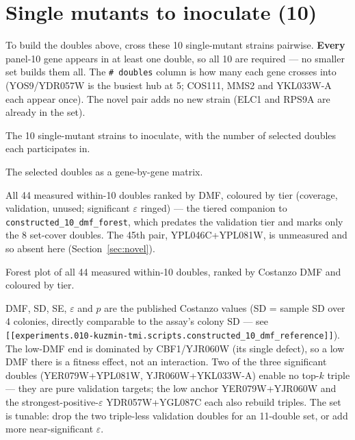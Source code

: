 \section{Single mutants to inoculate (10)}

To build the doubles above, cross these 10 single-mutant strains pairwise. \textbf{Every}
panel-10 gene appears in at least one double, so all 10 are required --- no smaller set builds
them all. The \texttt{\# doubles} column is how many each gene crosses into (YOS9/YDR057W is
the busiest hub at 5; COS111, MMS2 and YKL033W-A each appear once). The novel pair adds no new
strain (ELC1 and RPS9A are already in the set).

%
  {The 10 single-mutant strains to inoculate, with the number of selected doubles each
   participates in.}

%
  {The selected doubles as a gene-by-gene matrix.}

All 44 measured within-10 doubles ranked by DMF, coloured by tier (coverage, validation,
unused; significant $\varepsilon$ ringed) --- the tiered companion to
\texttt{constructed\_10\_dmf\_forest}, which predates the validation tier and marks only the 8
set-cover doubles. The 45th pair, YPL046C+YPL081W, is unmeasured and so absent here
(Section~\ref{sec:novel}).

%
  {Forest plot of all 44 measured within-10 doubles, ranked by Costanzo DMF and coloured by
   tier.}

DMF, SD, SE, $\varepsilon$ and $p$ are the published Costanzo values (SD = sample SD over 4
colonies, directly comparable to the assay's colony SD --- see
\texttt{[[experiments.010-kuzmin-tmi.scripts.constructed\_10\_dmf\_reference]]}). The low-DMF
end is dominated by CBF1/YJR060W (its single defect), so a low DMF there is a fitness effect,
not an interaction. Two of the three significant doubles (YER079W+YPL081W,
YJR060W+YKL033W-A) enable no top-$k$ triple --- they are pure validation targets; the low
anchor YER079W+YJR060W and the strongest-positive-$\varepsilon$ YDR057W+YGL087C each also
rebuild triples. The set is tunable: drop the two triple-less validation doubles for an
11-double set, or add more near-significant $\varepsilon$.

